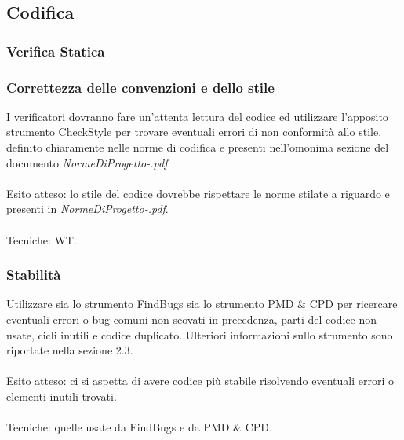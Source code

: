 \subsection{Codifica}

\subsubsection{Verifica Statica}

\subsubsection*{Correttezza delle convenzioni e dello stile}
I verificatori dovranno fare un'attenta lettura del codice ed utilizzare
l'apposito strumento CheckStyle per trovare eventuali errori di non
conformit\`a allo stile, definito chiaramente nelle norme di codifica e
presenti nell'omonima sezione del documento
\emph{NormeDiProgetto-\versionenormeprogetto.pdf}\\\\
Esito atteso: lo stile del codice dovrebbe rispettare le norme stilate a
riguardo e presenti in \emph{NormeDiProgetto-\versionenormeprogetto.pdf}.\\\\ 
Tecniche: WT.

\subsubsection*{Stabilit\`a}
Utilizzare sia lo strumento FindBugs sia lo strumento PMD \& CPD per ricercare
eventuali errori o bug comuni non scovati in precedenza, parti del codice non
usate, cicli inutili e codice duplicato. Ulteriori informazioni sullo strumento
sono riportate nella sezione 2.3.\\\\ 
Esito atteso: ci si aspetta di avere codice pi\`u stabile risolvendo
eventuali errori o elementi inutili trovati.\\\\ 
Tecniche: quelle usate da FindBugs e da PMD \& CPD.

